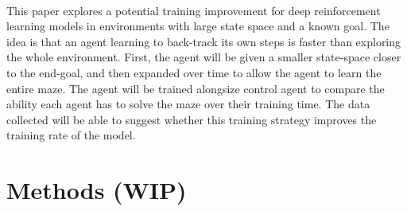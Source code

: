 \documentclass[12pt]{article}
\begin{document}

\paragraph{}
This paper explores a potential training improvement for deep reinforcement learning models in environments with large state space and a known goal.
The idea is that an agent learning to back-track its own steps is faster than exploring the whole environment.
First, the agent will be given a smaller state-space closer to the end-goal, and then expanded over time to allow the agent to learn the entire maze.
The agent will be trained alongsize control agent to compare the ability each agent has to solve the maze over their training time.
The data collected will be able to suggest whether this training strategy improves the training rate of the model.

\newpage



\section{Methods (WIP)}





\end{document}
